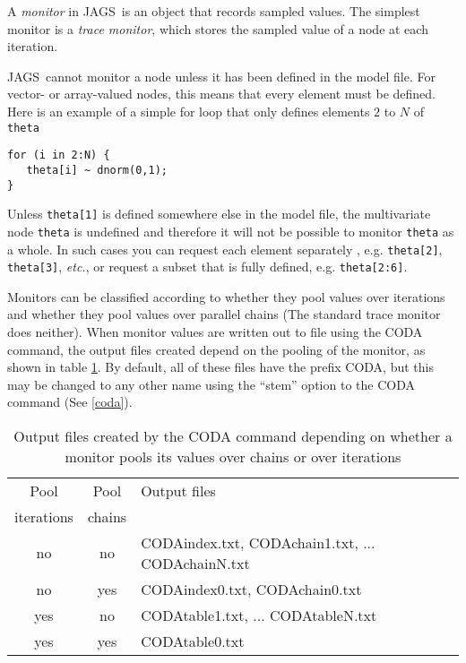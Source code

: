 \documentclass[11pt, a4paper, titlepage]{report}
\newcommand{\JAGS}{\textsf{JAGS}}
\begin{document}
A {\em monitor} in \JAGS\ is an object that records sampled
values. The simplest monitor is a {\em trace monitor}, which stores
the sampled value of a node at each iteration.

\JAGS\ cannot monitor a node unless it has been defined in the model
file.  For vector- or array-valued nodes, this means that every
element must be defined. Here is an example of a simple for loop that
only defines elements $2$ to $N$ of \verb+theta+

\begin{verbatim}
for (i in 2:N) {
   theta[i] ~ dnorm(0,1);
}
\end{verbatim}

Unless \verb+theta[1]+ is defined somewhere else in the model file,
the multivariate node \verb+theta+ is undefined and therefore it
will not be possible to monitor \verb+theta+ as a whole.  In such
cases you can request each element separately , e.g. \verb+theta[2]+,
\verb+theta[3]+, {\em etc.}, or request a subset that is fully defined,
e.g. \verb+theta[2:6]+.

Monitors can be classified according to whether they pool values over
iterations and whether they pool values over parallel chains (The
standard trace monitor does neither). When monitor values are written
out to file using the CODA command, the output files created depend
on the pooling of the monitor, as shown in table \ref{table:coda}. By
default, all of these files have the prefix CODA, but this may be changed
to any other name using the ``stem'' option to the CODA command
(See \ref{coda}).

\begin{table}[h]
\begin{tabular}{ccl}
\hline
Pool       & Pool   & Output files \\
iterations & chains &              \\
\hline
no         & no     & CODAindex.txt, CODAchain1.txt, ... 
                      CODAchainN.txt \\
no         & yes    & CODAindex0.txt, CODAchain0.txt \\
yes        & no     & CODAtable1.txt, ... CODAtableN.txt \\
yes        & yes    & CODAtable0.txt \\
\hline
\end{tabular}
\caption{Output files created by the CODA command depending on whether
a monitor pools its values over chains or over iterations \label{table:coda}}
\end{table}
\end{document}
